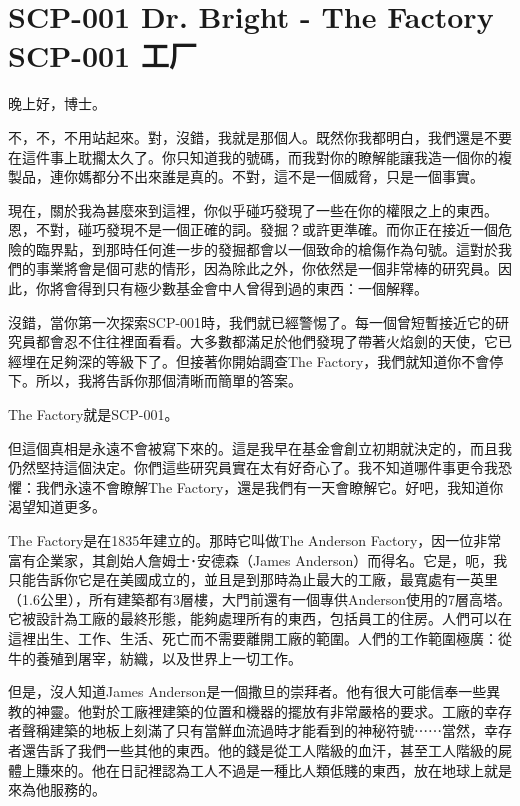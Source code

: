 \chapter[SCP-001 工厂]{
	SCP-001 Dr. Bright - The Factory \\ 
	SCP-001 工厂
}

\label{chap:SCP-001.the.factory}


晚上好，博士。

不，不，不用站起來。對，沒錯，我就是那個人。既然你我都明白，我們還是不要在這件事上耽擱太久了。你只知道我的號碼，而我對你的瞭解能讓我造一個你的複製品，連你媽都分不出來誰是真的。不對，這不是一個威脅，只是一個事實。

現在，關於我為甚麼來到這裡，你似乎碰巧發現了一些在你的權限之上的東西。恩，不對，碰巧發現不是一個正確的詞。發掘？或許更準確。而你正在接近一個危險的臨界點，到那時任何進一步的發掘都會以一個致命的槍傷作為句號。這對於我們的事業將會是個可悲的情形，因為除此之外，你依然是一個非常棒的研究員。因此，你將會得到只有極少數基金會中人曾得到過的東西：一個解釋。

沒錯，當你第一次探索SCP-001時，我們就已經警惕了。每一個曾短暫接近它的研究員都會忍不住往裡面看看。大多數都滿足於他們發現了帶著火焰劍的天使，它已經埋在足夠深的等級下了。但接著你開始調查The Factory，我們就知道你不會停下。所以，我將告訴你那個清晰而簡單的答案。

The Factory就是SCP-001。

但這個真相是永遠不會被寫下來的。這是我早在基金會創立初期就決定的，而且我仍然堅持這個決定。你們這些研究員實在太有好奇心了。我不知道哪件事更令我恐懼：我們永遠不會瞭解The Factory，還是我們有一天會瞭解它。好吧，我知道你渴望知道更多。

The Factory是在1835年建立的。那時它叫做The Anderson Factory，因一位非常富有企業家，其創始人詹姆士･安德森（James Anderson）而得名。它是，呃，我只能告訴你它是在美國成立的，並且是到那時為止最大的工廠，最寬處有一英里（1.6公里），所有建築都有3層樓，大門前還有一個專供Anderson使用的7層高塔。它被設計為工廠的最終形態，能夠處理所有的東西，包括員工的住房。人們可以在這裡出生、工作、生活、死亡而不需要離開工廠的範圍。人們的工作範圍極廣：從牛的養殖到屠宰，紡織，以及世界上一切工作。

但是，沒人知道James Anderson是一個撒旦的崇拜者。他有很大可能信奉一些異教的神靈。他對於工廠裡建築的位置和機器的擺放有非常嚴格的要求。工廠的幸存者聲稱建築的地板上刻滿了只有當鮮血流過時才能看到的神秘符號⋯⋯當然，幸存者還告訴了我們一些其他的東西。他的錢是從工人階級的血汗，甚至工人階級的屍體上賺來的。他在日記裡認為工人不過是一種比人類低賤的東西，放在地球上就是來為他服務的。

